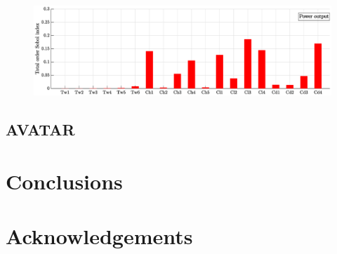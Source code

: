 \documentclass[review]{elsarticle}
\numberwithin{equation}{section}
\newcommand{\myreferences}{../references,../Mendeley_refs}
\numberwithin{equation}{section}
\begin{document}
\begin{figure}[h!]
\centering
\includegraphics[trim={1cm 0cm 0 0cm},clip, scale=0.4]{SA_Power_chord_twist_Cl_Cd.eps}
\caption{}
\label{perturbed_samples}
\end{figure}

\subsection{AVATAR}

\section{Conclusions}\label{sec:conclusions}

\section*{Acknowledgements}

\newpage


\newpage

\appendix

\end{document}
